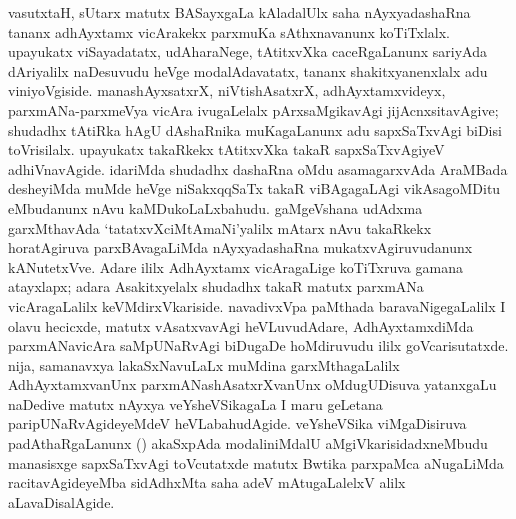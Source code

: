 vasutxtaH, sUtarx matutx BASayxgaLa kAladalUlx saha nAyxyadashaRna tananx \hbox{adhAyxtamx} vicArakekx parxmuKa sAthxnavanunx koTiTxlalx. upayukatx viSayadatatx, udAharaNege, tAtitxvXka caceRgaLanunx sariyAda dAriyalilx naDesuvudu heVge modalAdavatatx, tananx shakitxyanenxlalx adu viniyoVgiside. manashAyxsatxrX, niVtishAsatxrX, adhAyxtamxvideyx, parxmANa-parxmeVya vicAra ivugaLelalx pArxsaMgikavAgi jijAcnxsitavAgive; shudadhx tAtiRka hAgU dAshaRnika muKagaLanunx adu sapxSaTxvAgi biDisi toVrisilalx. upayukatx takaRkekx tAtitxvXka takaR sapxSaTxvAgiyeV adhiVnavAgide. idariMda shudadhx dashaRna oMdu asa\-magarxvAda AraMBada desheyiMda muMde heVge niSakxqqSaTx takaR viBAgagaLAgi vikAsa\-goMDitu eMbudanunx nAvu kaMDukoLaLxbahudu. gaMgeVshana udAdxma garxMthavAda `tatatxvXciMtAmaNi'yalilx mAtarx nAvu takaRkekx horatAgiruva parxBAvagaLiMda nAyxya\-dashaRna mukatxvAgiruvudanunx kANutetxVve. Adare ililx AdhAyxtamx vicAragaLige koTiTx\-ruva gamana atayxlapx; adara Asakitxyelalx shudadhx takaR matutx parxmANa vicAragaLalilx keVMdirxVkariside. navadivxVpa paMthada baravaNigegaLalilx I olavu hecicxde, matutx vAsatxva\-vAgi heVLuvudAdare, AdhAyxtamxdiMda parxmANavicAra saMpUNaRvAgi biDugaDe hoMdiruvudu ililx goVcarisutatxde. nija, samanavxya lakaSxNavuLaLx muMdina garxMtha\-gaLalilx AdhAyxtamxvanUnx parxmANashAsatxrXvanUnx oMdugUDisuva yatanxgaLu naDedive matutx nAyxya veYsheVSikagaLa I maru geLetana paripUNaRvAgideyeMdeV heVLa\-bahu\-dAgide. veYsheVSika viMgaDisiruva padAthaRgaLanunx () akaSxpAda modali\-niMdalU aMgiVkarisidadxneMbudu manasisxge sapxSaTxvAgi toVcutatxde matutx Bwtika parxpaMca aNugaLiMda racitavAgideyeMba sidAdhxMta saha adeV mAtugaLalelxV alilx aLavaDisalAgide.

